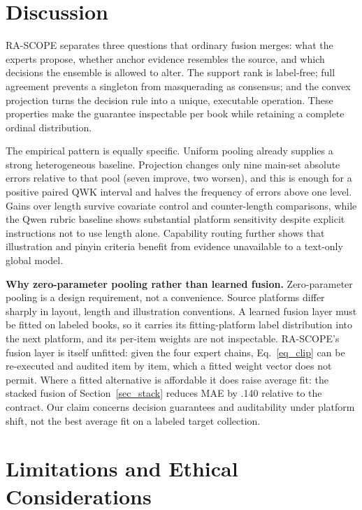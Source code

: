 \documentclass[conference]{IEEEtran}
\begin{document}
\section{Discussion}

RA-SCOPE separates three questions that ordinary fusion merges: what the
experts propose, whether anchor evidence resembles the source, and which
decisions the ensemble is allowed to alter. The support rank is label-free;
full agreement prevents a singleton from masquerading as consensus; and the
convex projection turns the decision rule into a unique, executable operation.
These properties make the guarantee inspectable per book while retaining a
complete ordinal distribution.

The empirical pattern is equally specific. Uniform pooling already supplies a
strong heterogeneous baseline. Projection changes only nine main-set absolute
errors relative to that pool (seven improve, two worsen), and this is enough for
a positive paired QWK interval and halves the frequency of errors above one
level. Gains over length survive covariate control and counter-length
comparisons, while the Qwen rubric baseline shows substantial platform
sensitivity despite explicit instructions not to use length alone. Capability
routing further shows that illustration and pinyin criteria benefit from
evidence unavailable to a text-only global model.

\noindent\textbf{Why zero-parameter pooling rather than learned fusion.}
Zero-parameter pooling is a design requirement, not a convenience. Source
platforms differ sharply in layout, length and illustration conventions. A
learned fusion layer must be fitted on labeled books, so it carries its
fitting-platform label distribution into the next platform, and its per-item
weights are not inspectable. RA-SCOPE's fusion layer is itself unfitted: given
the four expert chains, Eq.~\ref{eq_clip} can be re-executed and audited item by
item, which a fitted weight vector does not permit. Where a fitted alternative
is affordable it does raise average fit: the stacked fusion of
Section~\ref{sec_stack} reduces MAE by .140 relative to the contract. Our claim
concerns decision guarantees and auditability under platform shift, not the best
average fit on a labeled target collection.

\section{Limitations and Ethical Considerations}
\end{document}
